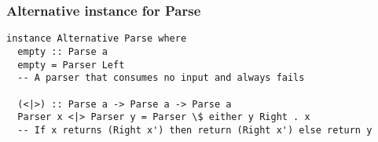 \documentclass{beamer}
\begin{document}
\begin{frame}

\frametitle{Alternative instance for Parse}

\begin{lstlisting}[frame=single]
instance Alternative Parse where
  empty :: Parse a
  empty = Parser Left
  -- A parser that consumes no input and always fails

  (<|>) :: Parse a -> Parse a -> Parse a
  Parser x <|> Parser y = Parser \$ either y Right . x
  -- If x returns (Right x') then return (Right x') else return y
\end{lstlisting}

%

%
%

\end{frame}
\end{document}
